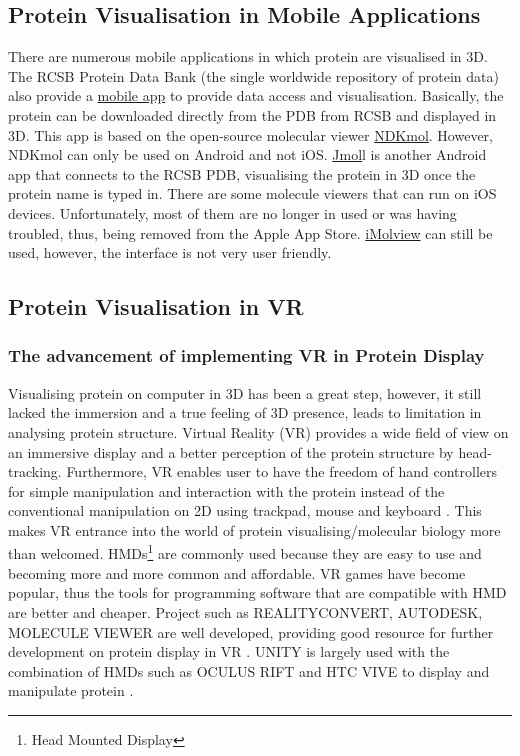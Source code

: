  \subsection{Protein Visualisation in Mobile Applications}

There are numerous mobile applications in which protein are visualised in 3D. The RCSB Protein Data Bank (the single worldwide repository of protein data) also provide a \href{https://www.ncbi.nlm.nih.gov/pmc/articles/PMC4271143/}{mobile app} to provide data access and visualisation. Basically, the protein can be downloaded directly from the PDB from RCSB and displayed in 3D. This app is based on the open-source molecular viewer \href{https://play.google.com/store/apps/details?id=jp.sfjp.webglmol.NDKmol&hl=en}{NDKmol}. However, NDKmol can only be used on Android and not iOS. \href{https://www.imedicalapps.com/2013/08/jmol-molecular-visualization-app/}{Jmol}l is another Android app that connects to the RCSB PDB, visualising the protein in 3D once the protein name is typed in.
There are some molecule viewers that can run on iOS devices. Unfortunately, most of them are no longer in used or was having troubled, thus, being removed from the Apple App Store. \href{https://www.molsoft.com/iMolview.html}{iMolview} can still be used, however, the interface is not very user friendly. 


\subsection{Protein Visualisation in VR}
\subsubsection{The advancement of implementing VR in Protein Display}
Visualising protein on computer in 3D has been a great step, however, it still lacked the immersion and a true feeling of 3D presence, leads to limitation in analysing protein structure. Virtual Reality (VR) provides a wide field of view on an immersive display and a better perception of the protein structure by head-tracking. Furthermore, VR enables user to have the freedom of hand controllers for simple manipulation and interaction with the protein instead of the conventional manipulation on 2D using trackpad, mouse and keyboard \parencite{goddard_molecular_2018}. This makes VR entrance into the world of protein visualising/molecular biology more than welcomed. 
HMDs\footnote{Head Mounted Display} are commonly used because they are easy to use and becoming more and more common and affordable. VR games have become popular, thus the tools for programming software that are compatible with HMD are better and cheaper. Project such as {\footnotesize REALITYCONVERT}, {\footnotesize AUTODESK}, {\footnotesize MOLECULE VIEWER} are well developed, providing good resource for further development on protein display in VR \parencite{ratamero_touching_2018}. {\footnotesize UNITY} is largely used with the combination of HMDs such as {\footnotesize OCULUS RIFT} and {\footnotesize HTC VIVE} to display and manipulate protein \parencite{ratamero_touching_2018}.

